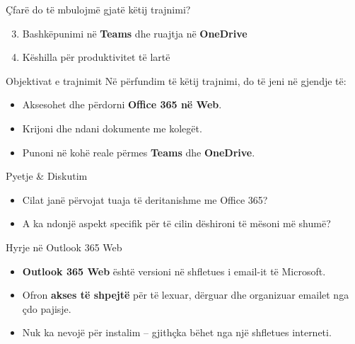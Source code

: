 \documentclass[
  ignorenonframetext,
]{beamer}
\begin{document}
\begin{frame}{Çfarë do të mbulojmë gjatë këtij trajnimi?}
\label{uxe7faruxeb-do-tuxeb-mbulojmuxeb-gjatuxeb-kuxebtij-trajnimi-1}
\begin{enumerate}
\setcounter{enumi}{2}
\item
  Bashkëpunimi në \textbf{Teams} dhe ruajtja në \textbf{OneDrive}
\item
  Këshilla për produktivitet të lartë
\end{enumerate}
\end{frame}

\begin{frame}{Objektivat e trajnimit}
\label{objektivat-e-trajnimit}
Në përfundim të këtij trajnimi, do të jeni në gjendje të:

\begin{itemize}
\item
  Aksesohet dhe përdorni \textbf{Office 365 në Web}.
\item
  Krijoni dhe ndani dokumente me kolegët.
\item
  Punoni në kohë reale përmes \textbf{Teams} dhe \textbf{OneDrive}.
\end{itemize}
\end{frame}

\begin{frame}{Pyetje \& Diskutim}
\label{pyetje-diskutim}
\begin{itemize}
\item
  Cilat janë përvojat tuaja të deritanishme me Office 365?
\item
  A ka ndonjë aspekt specifik për të cilin dëshironi të mësoni më shumë?
\end{itemize}
\end{frame}

\begin{frame}{Hyrje në Outlook 365 Web}
\label{hyrje-nuxeb-outlook-365-web}
\begin{itemize}
\item
  \textbf{Outlook 365 Web} është versioni në shfletues i email-it të
  Microsoft.
\item
  Ofron \textbf{akses të shpejtë} për të lexuar, dërguar dhe organizuar
  emailet nga çdo pajisje.
\item
  Nuk ka nevojë për instalim -- gjithçka bëhet nga një shfletues
  interneti.
\end{itemize}
\end{frame}
\end{document}
